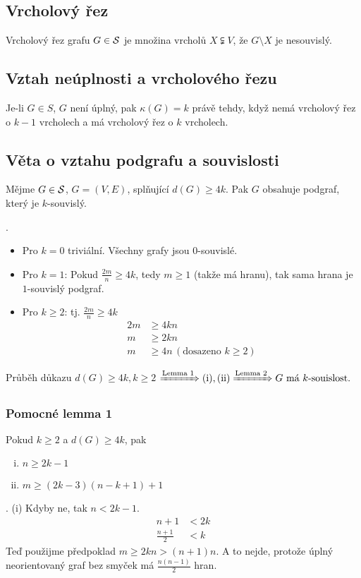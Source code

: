 \subsection{Vrcholový řez}\label{vrchRez}
Vrcholový řez grafu $G \in \S$ je množina vrcholů $X \subsetneqq V$, že $G \setminus X$ je nesouvislý.

\subsection{Vztah neúplnosti a vrcholového řezu}
Je-li $G \in S$, $G$ není úplný, pak $\kappa(G)=k$ právě tehdy, když nemá vrcholový řez o $k-1$ vrcholech a má vrcholový 
řez o $k$ vrcholech.

\subsection{Věta o vztahu podgrafu a souvislosti}
Mějme $G \in \S$, $G = (V,E)$, splňující $d(G) \geq 4k$. Pak $G$ obsahuje podgraf, který je $k$-souvislý.

. 
\begin{itemize}
    \item Pro $k=0$ triviální. Všechny grafy jsou $0$-souvislé.
    \item Pro $k=1$: Pokud $\frac{2m}{n} \geq 4k$, tedy $m \geq 1$ (takže má hranu), tak sama hrana je $1$-souvislý 
    podgraf.
    \item Pro $k \geq 2$: tj. $\frac{2m}{n} \geq 4k$
    \begin{align*}
        2m &\geq 4kn \\
        m &\geq 2kn \\
        m &\geq 4n \, (\text{dosazeno } k \geq 2)
    \end{align*}
\end{itemize}
Průběh důkazu $d(G) \geq 4k, k\geq 2$ $\xRightarrow{\text{Lemma 1}} (\text{i}), (\text{ii}) \xRightarrow{\text{Lemma 2}} 
G \text{ má } k \text{-souislost.}$
\subsubsection{Pomocné lemma 1}
Pokud $k \geq 2$ a $d(G) \geq 4k$, pak
\begin{enumerate}[(i), noitemsep]
    \item $n \geq 2k-1$
    \item $m \geq (2k-3)(n-k+1)+1$
\end{enumerate}
. (i) Kdyby ne, tak $n<2k-1$.
\begin{align*}
    n+1 &< 2k\\
    \frac{n+1}{2} &<k
\end{align*}
Teď použijme předpoklad $m \geq 2kn > (n+1)n$. A to nejde, protože úplný neorientovaný graf bez smyček má 
$\frac{n(n-1)}{2}$ hran.

